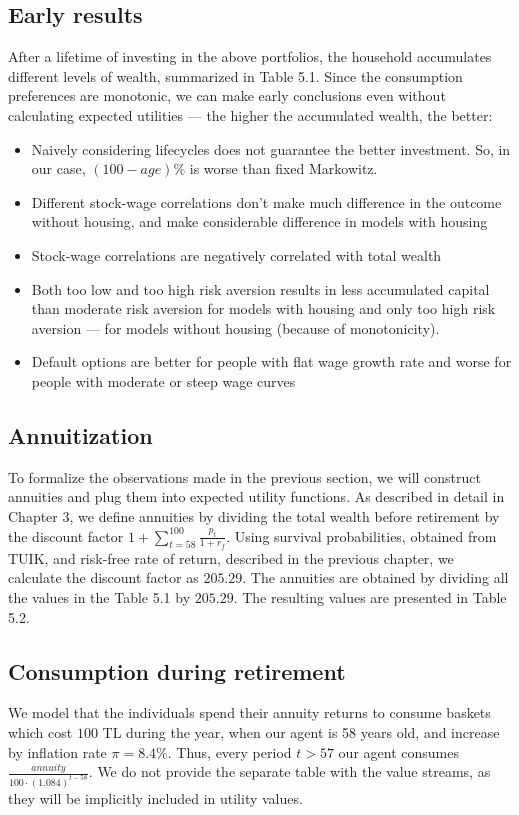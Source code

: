 \subsection{Early results}

After a lifetime of investing in the above portfolios, the household accumulates different levels of wealth, summarized in Table 5.1. Since the consumption preferences are monotonic, we can make early conclusions even without calculating expected utilities --- the higher the accumulated wealth, the better: 

\begin{itemize}
\item Naively considering lifecycles does not guarantee the better investment. So, in our case, $(100-age)\%$ is worse than fixed Markowitz.
\item Different stock-wage correlations don't make much difference in the outcome without housing, and make considerable difference in models with housing
\item Stock-wage correlations are negatively correlated with total wealth
\item Both too low and too high risk aversion results in less accumulated capital than moderate risk aversion for models with housing and only too high risk aversion --- for models without housing (because of monotonicity).\\
\item Default options are better for people with flat wage growth rate and worse for people with moderate or steep wage curves
\end{itemize}

\subsection{Annuitization}
To formalize the observations made in the previous section, we will construct annuities and plug them into expected utility functions. As described in detail in Chapter 3, we define annuities by dividing the total wealth before retirement by the discount factor $1 + \sum^{100}_{t=58}\frac{p_t}{1+r_f}$. Using survival probabilities, obtained from TUIK, and risk-free rate of return, described in the previous chapter, we calculate the discount factor as $205.29$. The annuities are obtained by dividing all the values in the Table 5.1 by $205.29$. The resulting values are presented in Table 5.2. 


\subsection{Consumption during retirement}
We model that the individuals spend their annuity returns to consume baskets which cost $100$ TL during the year, when our agent is 58 years old, and increase by inflation rate $\pi = 8.4\%$. Thus, every period $t>57$ our agent consumes $\frac{annuity}{100\cdot\left(1.084\right)^{t-58}}$. We do not provide the separate table with the value streams, as they will be implicitly included in utility values.


